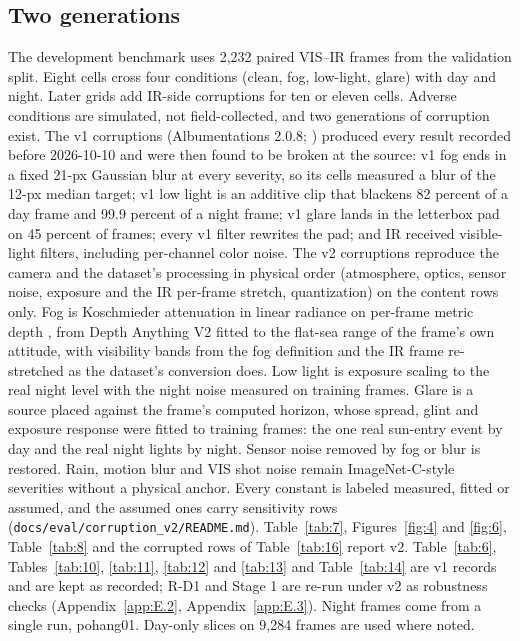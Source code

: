 \documentclass[10pt]{article}
\begin{document}
\subsection{Two generations}\label{app:B.1}
The development benchmark uses 2,232 paired VIS--IR frames from the validation split. Eight cells cross four conditions (clean, fog, low-light, glare) with day and night. Later grids add IR-side corruptions for ten or eleven cells. Adverse conditions are simulated, not field-collected, and two generations of corruption exist. The v1 corruptions (Albumentations 2.0.8; \citealp{buslaev2020albumentations}) produced every result recorded before 2026-10-10 and were then found to be broken at the source: v1 fog ends in a fixed 21-px Gaussian blur at every severity, so its cells measured a blur of the 12-px median target; v1 low light is an additive clip that blackens 82 percent of a day frame and 99.9 percent of a night frame; v1 glare lands in the letterbox pad on 45 percent of frames; every v1 filter rewrites the pad; and IR received visible-light filters, including per-channel color noise. The v2 corruptions reproduce the camera and the dataset's processing in physical order (atmosphere, optics, sensor noise, exposure and the IR per-frame stretch, quantization) on the content rows only. Fog is Koschmieder attenuation in linear radiance on per-frame metric depth \citep{sakaridis2018semantic}, from Depth Anything V2 \citep{yang2024depth} fitted to the flat-sea range of the frame's own attitude, with visibility bands from the fog definition and the IR frame re-stretched as the dataset's conversion does. Low light is exposure scaling to the real night level with the night noise measured on training frames. Glare is a source placed against the frame's computed horizon, whose spread, glint and exposure response were fitted to training frames: the one real sun-entry event by day and the real night lights by night. Sensor noise removed by fog or blur is restored. Rain, motion blur and VIS shot noise remain ImageNet-C-style severities \citep{hendrycks2019benchmarking} without a physical anchor. Every constant is labeled measured, fitted or assumed, and the assumed ones carry sensitivity rows (\texttt{docs/\allowbreak{}eval/\allowbreak{}corruption\_\allowbreak{}v2/\allowbreak{}README.md}). Table~\ref{tab:7}, Figures~\ref{fig:4} and \ref{fig:6}, Table~\ref{tab:8} and the corrupted rows of Table~\ref{tab:16} report v2. Table~\ref{tab:6}, Tables~\ref{tab:10}, \ref{tab:11}, \ref{tab:12} and \ref{tab:13} and Table~\ref{tab:14} are v1 records and are kept as recorded; R-D1 and Stage 1 are re-run under v2 as robustness checks (Appendix~\ref{app:E.2}, Appendix~\ref{app:E.3}). Night frames come from a single run, pohang01. Day-only slices on 9,284 frames are used where noted.
\end{document}

